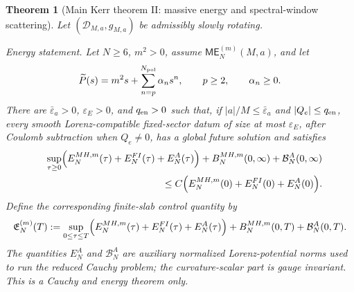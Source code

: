 \documentclass[11pt]{article}
\numberwithin{equation}{section}
\theoremstyle{plain}
\newtheorem{theorem}{Theorem}[section]
\theoremstyle{definition}
\theoremstyle{remark}
\newcommand{\ME}{\mathsf{ME}}
\begin{document}
\begin{theorem}[Main Kerr theorem II: massive energy and spectral-window scattering]\label{thm:main-slow-kerr-massive-intro}
Let \((\mathcal D_{M,a},g_{M,a})\) be admissibly slowly rotating.

\emph{Energy statement.}  Let \(N\ge6\), \(m^2>0\), assume \(\ME_N^{(m)}(M,a)\), and let
\begin{equation}\label{eq:intro-positive-massive-potential}
 \widetilde P(s)=m^2s+\sum_{n=p}^{N_{\rm pol}}\alpha_n s^n,
 \qquad p\ge2,
 \qquad \alpha_n\ge0.
\end{equation}
There are \(\bar\varepsilon_a>0\), \(\varepsilon_E>0\), and \(q_{\rm en}>0\) such that, if \(|a|/M\le\bar\varepsilon_a\) and \(|Q_e|\le q_{\rm en}\), every smooth Lorenz-compatible fixed-sector datum of size at most \(\varepsilon_E\), after Coulomb subtraction when \(Q_e\ne0\), has a global future solution and satisfies
\begin{eqnarray}
&&\sup_{\tau\ge0}
 \Bigl(E^{MH,m}_{N}(\tau)+E^{FI}_{N}(\tau)+E^{A}_{N}(\tau)\Bigr)
 +B^{MH,m}_{N}(0,\infty)+\mathcal B^{A}_{N}(0,\infty)
 \nonumber\\
&&\hspace{4cm}
 \le C\Bigl(E^{MH,m}_{N}(0)+E^{FI}_{N}(0)+E^{A}_{N}(0)\Bigr).
 \label{eq:intro-massive-energy-bound}
\end{eqnarray}
Define the corresponding finite-slab control quantity by
\begin{equation}\label{eq:intro-F-energy-slab}
 \mathfrak E_N^{(m)}(T):=
 \sup_{0\le\tau\le T}
 \Bigl(E^{MH,m}_{N}(\tau)+E^{FI}_{N}(\tau)+E^{A}_{N}(\tau)\Bigr)
 +B^{MH,m}_{N}(0,T)+\mathcal B^{A}_{N}(0,T).
\end{equation}
The quantities \(E^A_N\) and \(\mathcal B^A_N\) are auxiliary normalized Lorenz-potential norms used to run the reduced Cauchy problem; the curvature-scalar part is gauge invariant.  This is a Cauchy and energy theorem only.


\end{theorem}
\end{document}

